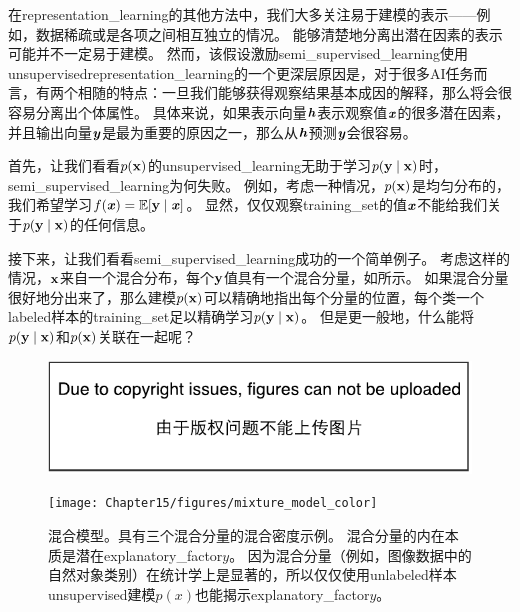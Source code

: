 
在\gls{representation_learning}的其他方法中，我们大多关注易于建模的表示——例如，数据稀疏或是各项之间相互独立的情况。
能够清楚地分离出潜在因素的表示可能并不一定易于建模。
然而，该假设激励\gls{semi_supervised_learning}使用\gls{unsupervised}\gls{representation_learning}的一个更深层原因是，对于很多\gls{AI}任务而言，有两个相随的特点：一旦我们能够获得观察结果基本成因的解释，那么将会很容易分离出个体属性。
具体来说，如果表示向量$\boldsymbol{\mathit{h}}$表示观察值$\boldsymbol{\mathit{x}}$的很多潜在因素，并且输出向量$\boldsymbol{\mathit{y}}$是最为重要的原因之一，那么从$\boldsymbol{\mathit{h}}$预测$\boldsymbol{\mathit{y}}$会很容易。


首先，让我们看看$p(\mathbf{x})$的\gls{unsupervised_learning}无助于学习$p(\mathbf{y}\mid\mathbf{x})$时，\gls{semi_supervised_learning}为何失败。
例如，考虑一种情况，$p(\mathbf{x})$是均匀分布的，我们希望学习$f(\boldsymbol{\mathit{x}}) = \mathbb{E}[\mathbf{y} \mid \boldsymbol{\mathit{x}}]$。
显然，仅仅观察\gls{training_set}的值$\boldsymbol{\mathit{x}}$不能给我们关于$p(\mathbf{y} \mid \mathbf{x})$的任何信息。


接下来，让我们看看\gls{semi_supervised_learning}成功的一个简单例子。
考虑这样的情况，$\mathbf{x}$来自一个混合分布，每个$\mathbf{y}$值具有一个混合分量，如所示。
如果混合分量很好地分出来了，那么建模$p(\mathbf{x})$可以精确地指出每个分量的位置，每个类一个\gls{labeled}样本的\gls{training_set}足以精确学习$p(\mathbf{y} \mid \mathbf{x})$。
但是更一般地，什么能将$p(\mathbf{y} \mid \mathbf{x})$和$p(\mathbf{x})$关联在一起呢？



\begin{figure}[!htb]
\ifOpenSource
\centerline{\includegraphics{figure.pdf}}
\else
\centerline{\texttt{[image: Chapter15/figures/mixture\_model\_color]}}
\fi
\caption{混合模型。具有三个混合分量的混合密度示例。
混合分量的内在本质是潜在\gls{explanatory_factor}$y$。
因为混合分量（例如，图像数据中的自然对象类别）在统计学上是显著的，所以仅仅使用\gls{unlabeled}样本\gls{unsupervised}建模$p(x)$也能揭示\gls{explanatory_factor}$y$。
}
\label{fig:chap15_mixture_model}
\end{figure}

